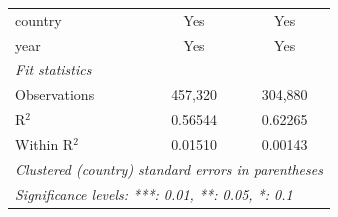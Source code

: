 \begin{tabular}{lcc}
   country                & Yes              & Yes\\  
   year                   & Yes              & Yes\\  
   \midrule
   \emph{Fit statistics}\\
   Observations           & 457,320          & 304,880\\  
   R$^2$                  & 0.56544          & 0.62265\\  
   Within R$^2$           & 0.01510          & 0.00143\\  
   \midrule \midrule
   \multicolumn{3}{l}{\emph{Clustered (country) standard errors in parentheses}}\\
   \multicolumn{3}{l}{\emph{Significance levels: ***: 0.01, **: 0.05, *: 0.1}}\\
\end{tabular}
\par\endgroup


